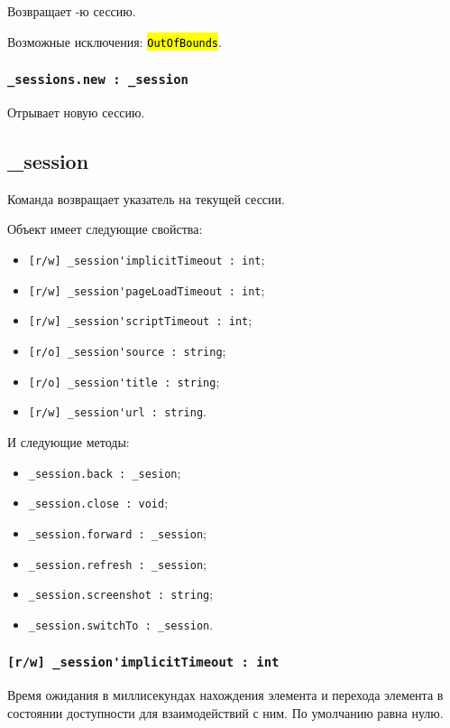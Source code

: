 \documentclass[a4paper, 14pt]{extarticle}
\newcommand{\ferror}[1]{{\fontsize{11pt}{12pt}\tt{\sethlcolor{yellow}\hl{#1}}}}
\newenvironment{icItems}
	{ \begin{itemize} [noitemsep,nolistsep] }
	{ \end{itemize} }
\begin{document}
Возвращает -ю сессию.

Возможные исключения: \ferror{OutOfBounds}.

\subsubsection{\lstinline|_sessions.new : _session|}

Отрывает новую сессию.

\subsection{{\color{orange} \_session}}

Команда \session{} возвращает указатель на текущей сессии.

Объект \session{} имеет следующие свойства:
\begin{icItems}
	\item \lstinline|[r/w] _session'implicitTimeout : int|;
	\item \lstinline|[r/w] _session'pageLoadTimeout : int|;
	\item \lstinline|[r/w] _session'scriptTimeout : int|;
	\item \lstinline|[r/o] _session'source : string|;
	\item \lstinline|[r/o] _session'title : string|;
	\item \lstinline|[r/w] _session'url : string|.
\end{icItems}

И следующие методы:
\begin{icItems}
	\item \lstinline|_session.back : _sesion|;
	\item \lstinline|_session.close : void|;
	\item \lstinline|_session.forward : _session|;
	\item \lstinline|_session.refresh : _session|;
	\item \lstinline|_session.screenshot : string|;
	\item \lstinline|_session.switchTo : _session|.
\end{icItems}

\subsubsection{\lstinline|[r/w] _session'implicitTimeout : int|}

Время ожидания в миллисекундах нахождения элемента и перехода элемента в состоянии доступности для взаимодействий с ним. По умолчанию равна нулю.
\end{document}
